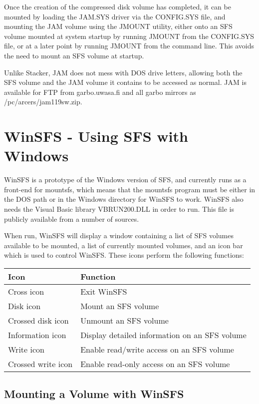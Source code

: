 Once the creation of the compressed disk volume has completed, it can be
mounted by loading the JAM.SYS driver via the CONFIG.SYS file, and mounting the
JAM volume using the JMOUNT utility, either onto an SFS volume mounted at
system startup by running JMOUNT from the CONFIG.SYS file, or at a later point
by running JMOUNT from the command line.  This avoids the need to mount an SFS
volume at startup.

Unlike Stacker, JAM does not mess with DOS drive letters, allowing both the SFS
volume and the JAM volume it contains to be accessed as normal.  JAM is
available for FTP from garbo.uwasa.fi and all garbo mirrors as
/pc/arcers/jam119sw.zip.


\section{WinSFS - Using SFS with Windows}

WinSFS is a prototype of the Windows version of SFS, and currently runs as a
front-end for mountsfs, which means that the mountsfs program must be either in
the DOS path or in the Windows directory for WinSFS to work.  WinSFS also needs
the Visual Basic library VBRUN200.DLL in order to run.  This file is publicly
available from a number of sources.

When run, WinSFS will display a window containing a list of SFS volumes
available to be mounted, a list of currently mounted volumes, and an icon bar
which is used to control WinSFS.  These icons perform the following functions:

\begin{center}
\begin{tabular}{|l|l|}
\hline
  Icon              & Function\\
\hline
  Cross icon        & Exit WinSFS\\
  Disk icon         & Mount an SFS volume\\
  Crossed disk icon & Unmount an SFS volume\\
  Information icon  & Display detailed information on an SFS volume\\
  Write icon        & Enable read/write access on an SFS volume\\
  Crossed write icon& Enable read-only access on an SFS volume\\
\hline
\end{tabular}
\end{center}

\subsection{Mounting a Volume with WinSFS}

